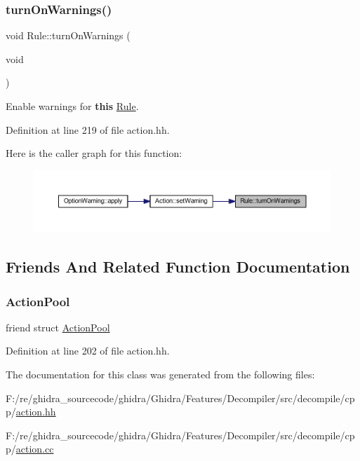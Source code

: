 \subsubsection{\texorpdfstring{turnOnWarnings()}{turnOnWarnings()}}
{\footnotesize\ttfamily void Rule\+::turn\+On\+Warnings (\begin{DoxyParamCaption}\item[{void}]{ }\end{DoxyParamCaption})\hspace{0.3cm}{\ttfamily [inline]}}



Enable warnings for {\bfseries{this}} \mbox{\hyperlink{class_rule}{Rule}}. 



Definition at line 219 of file action.\+hh.

Here is the caller graph for this function\+:
\nopagebreak
\begin{figure}[H]
\begin{center}
\leavevmode
\includegraphics[width=350pt]{class_rule_a3c8853bae236ab20a20c25907c694914_icgraph}
\end{center}
\end{figure}


\subsection{Friends And Related Function Documentation}
\mbox{\label{class_rule_a11322726e5924e10ecfc5307baf9958c}} 
\subsubsection{\texorpdfstring{ActionPool}{ActionPool}}
{\footnotesize\ttfamily friend struct \mbox{\hyperlink{class_action_pool}{Action\+Pool}}\hspace{0.3cm}{\ttfamily [friend]}}



Definition at line 202 of file action.\+hh.



The documentation for this class was generated from the following files\+:\begin{DoxyCompactItemize}
\item 
F\+:/re/ghidra\+\_\+sourcecode/ghidra/\+Ghidra/\+Features/\+Decompiler/src/decompile/cpp/\mbox{\hyperlink{action_8hh}{action.\+hh}}\item 
F\+:/re/ghidra\+\_\+sourcecode/ghidra/\+Ghidra/\+Features/\+Decompiler/src/decompile/cpp/\mbox{\hyperlink{action_8cc}{action.\+cc}}\end{DoxyCompactItemize}

